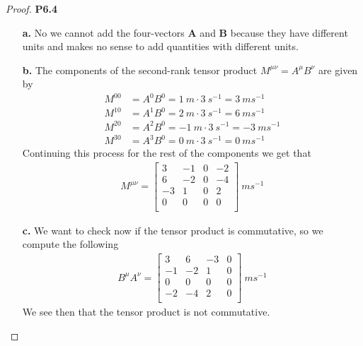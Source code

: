 \documentclass[11pt]{article}
\theoremstyle{definition}
\begin{document}
\cleardoublepage
\begin{proof}{\textbf{P6.4}}
\begin{itemize}
    \item [\textbf{a.}] No we cannot add the four-vectors $\bm{A}$ and $\bm{B}$
    because they have different units and makes no sense to add quantities with
    different units.

    \item [\textbf{b.}] The components of the second-rank tensor product
    $M^{\mu\nu} = A^\mu B^\nu$ are given by
    \begin{align*}
        M^{00} &= A^{0}B^0 = 1~m \cdot 3 ~s^{-1} = 3~ms^{-1}\\
        M^{10} &= A^{1}B^0 = 2~m \cdot 3 ~s^{-1} = 6~ms^{-1}\\
        M^{20} &= A^{2}B^0 = -1~m \cdot 3 ~s^{-1} = -3~ms^{-1}\\
        M^{30} &= A^{3}B^0 = 0~m \cdot 3 ~s^{-1} = 0~ms^{-1}
    \end{align*}
    Continuing this process for the rest of the components we get that
    \begin{align*}
        M^{\mu\nu} =\begin{bmatrix}
            3 & -1 & 0 & -2\\
            6 & -2 & 0 & -4\\
            -3 & 1 & 0 & 2\\
            0 & 0 & 0 & 0\\
        \end{bmatrix}~ms^{-1}
    \end{align*}
    
    \item [\textbf{c.}] We want to check now if the tensor product
    is commutative, so we compute the following
    \begin{align*}
        B^\mu A^{\nu} =\begin{bmatrix}
            3 & 6 & -3 & 0\\
            -1 & -2 & 1 & 0\\
            0 & 0 & 0 & 0\\
            -2 & -4 & 2 & 0\\
        \end{bmatrix}~ms^{-1}
    \end{align*}
    We see then that the tensor product is not commutative.
    

\end{itemize}
\end{proof}
\end{document}

